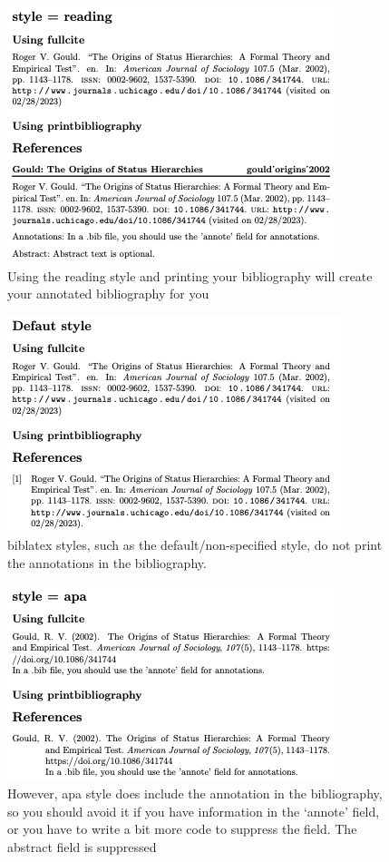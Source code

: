\documentclass{article}
\begin{document}
\begin{figure}[!ht]
\centering
\includegraphics{screenshots/Bib3a.png}
\caption{Using the reading style and printing your bibliography will create your annotated bibliography for you}
\end{figure}

\begin{figure}[!ht]
\centering
\includegraphics{screenshots/Bib3c.png}
\caption{biblatex styles, such as the default/non-specified style, do not print the annotations in the bibliography.}
\end{figure}


\begin{figure}[!ht]
\centering
\includegraphics{screenshots/Bib3b.png}
\caption{However, apa style does include the annotation in the bibliography, so you should avoid it if you have information in the `annote' field, or you have to write a bit more code to suppress the field. The abstract field is suppressed}
\end{figure}
\end{document}
